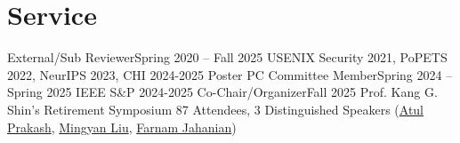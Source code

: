 \section{Service}
\CVSubHeadingListStart
    \CVSubheading
      {External/Sub Reviewer}{Spring 2020 -- Fall 2025}
      {USENIX Security 2021, PoPETS 2022, NeurIPS 2023, CHI 2024-2025}{}
    \CVSubheading
    {Poster PC Committee Member}{Spring 2024 -- Spring 2025}
      {IEEE S\&P 2024-2025}{}
    \CVSubheadingLong
    {Co-Chair/Organizer}{Fall 2025}
      {Prof. Kang G. Shin's Retirement Symposium}{}
      {87 Attendees, 3 Distinguished Speakers (\href{https://web.eecs.umich.edu/~aprakash/}{Atul Prakash}, \href{https://en.wikipedia.org/wiki/Mingyan_Liu}{Mingyan Liu}, \href{https://en.wikipedia.org/wiki/Farnam_Jahanian}{Farnam Jahanian})}{}
  \CVSubHeadingListEnd